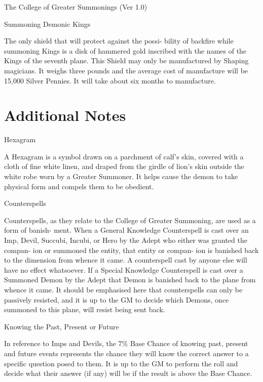 \begin{Chapter}{The College of Greater Summonings (Ver 1.0)}
\begin{ritual}[R-6]{Summoning Demonic Kings }
\begin{effects}
The only shield that will protect against the possi-
bility of backfire while summoning Kings is a disk 
of hammered gold inscribed with the names of the 
Kings  of  the  seventh  plane.  This  Shield  may  only 
be  manufactured  by  Shaping  magicians.  It  weighs 
three  pounds  and  the  average  cost  of  manufacture 
will be 15,000 Silver Pennies. It will take about six 
months to manufacture. 


\end{effects}
\end{ritual}

\section{Additional Notes}

Hexagram 

A Hexagram is a symbol drawn on a parchment of 
calf’s skin, covered with a cloth of fine white linen, 
and  draped  from  the  girdle  of  lion’s  skin  outside 
the  white  robe  worn  by  a  Greater  Summoner.  It 
helps  cause  the  demon  to  take  physical  form  and 
compels them to be obedient. 

Counterspells 

Counterspells,  as  they  relate  to  the  College  of 
Greater Summoning, are used as a form of banish-
ment. When  a  General  Knowledge  Counterspell  is 
cast  over  an  Imp,  Devil,  Succubi,  Incubi,  or  Hero 
by  the  Adept  who  either  was  granted  the  compan-
ion or summoned the entity, that entity or compan-
ion is banished back to the dimension from whence 
it  came.  A  counterspell  cast  by  anyone  else  will 
have no effect whatsoever. If a Special Knowledge 
Counterspell  is  cast  over  a  Summoned  Demon  by 
the Adept that Demon is banished back to the plane 
from whence it came. It should be emphasised here 
that  counterspells  can  only  be  passively  resisted, 
and  it  is  up  to  the  GM  to  decide  which  Demons, 
once summoned to this plane, will resist being sent 
back. 

Knowing the Past, Present or Future 

In  reference  to  Imps  and  Devils,  the  7\%  Base 
Chance of knowing past, present and future events 
represents  the  chance  they  will  know  the  correct 
answer  to  a  specific  question  posed  to  them.  It  is 
up to  the  GM  to  perform the  roll  and  decide  what 
their  answer  (if  any)  will  be  if  the  result  is  above 
the Base Chance. 

\end{Chapter}
